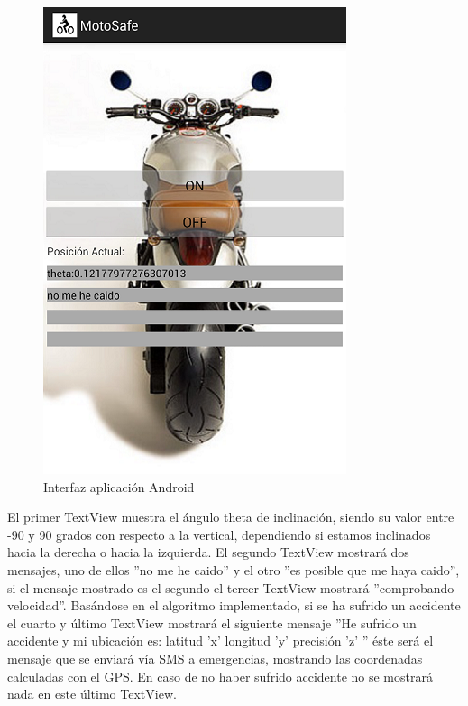 			\begin{figure}[h]
				\centering
				\includegraphics{imagenes/interfaz.png}
				\caption{Interfaz aplicación Android}
				\label{contexto:figura}
			\end{figure}
			
			El primer TextView muestra el ángulo theta de inclinación, siendo su valor entre -90 y 90 grados con respecto a la vertical, dependiendo si estamos inclinados hacia la derecha o hacia la izquierda. El segundo TextView mostrará dos mensajes, uno de ellos ''no me he caido'' y el otro ''es posible que me haya caido'', si el mensaje mostrado es el segundo el tercer TextView mostrará ''comprobando velocidad''. Basándose en el algoritmo implementado, si se ha sufrido un accidente el cuarto y último TextView mostrará el siguiente mensaje ''He sufrido un accidente y mi ubicación es: latitud 'x' longitud 'y' precisión 'z' '' éste será el mensaje que se enviará vía SMS a emergencias, mostrando las coordenadas calculadas con el GPS. En caso de no haber sufrido accidente no se mostrará nada en este último TextView. 
			
			

	\newpage
	$\ $
	
